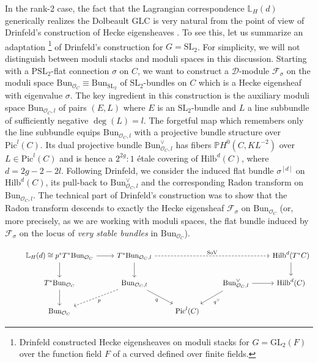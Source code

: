 \documentclass[twoside, 11pt]{article}
\numberwithin{equation}{section}
\theoremstyle{theorem}
\numberwithin{theorem}{section}
\theoremstyle{definition}
\begin{document}
In the rank-2 case, the fact that the Lagrangian correspondence $\mathbb{L}_H(d)$ generically realizes the Dolbeault GLC is very natural from the point of view of Drinfeld's construction of Hecke eigensheaves \cite{Drinfeld}.
To see this, let us summarize an adaptation 
\footnote{Drinfeld constructed Hecke eigensheaves on moduli stacks for $G = \mathrm{GL}_2(F)$ over the function field $F$ of a curved defined over finite fields.}
of Drinfeld's construction for $G = \mathrm{SL}_2$.
For simplicity, we will not distinguish between moduli stacks and moduli spaces in this discussion.
Starting with a $\mathrm{PSL}_2$-flat connection $\sigma$ on $C$, we want to construct a $\mathcal{D}$-module $\mathcal{F}_\sigma$ on the moduli space $\mathrm{Bun}_{\mathcal{O}_C} \equiv \mathrm{Bun}_{\mathrm{SL}_2}$ of $\mathrm{SL}_2$-bundles on $C$ which is a Hecke eigensheaf with eigenvalue $\sigma$.
The key ingredient in this construction is the auxiliary moduli space $\mathrm{Bun}_{\mathcal{O}_C, l}$ of pairs $(E, L)$ where $E$ is an $\mathrm{SL}_2$-bundle and $L$ a line subbundle of sufficiently negative  $\deg(L) = l$.
The forgetful map which remembers only the line subbundle equips $\mathrm{Bun}_{\mathcal{O}_C, l}$ with a projective bundle structure over $\mathrm{Pic}^l(C)$. 
Its dual projective bundle $\mathrm{Bun}^\vee_{\mathcal{O}_C, l}$ has fibers $\mathbb{P}H^0(C, KL^{-2})$ over $L \in \mathrm{Pic}^l(C)$ and is hence a $2^{2g}:1$ étale covering of $\mathrm{Hilb}^d(C)$, where $d = 2g - 2 - 2l$.
Following Drinfeld, we consider the induced flat bundle $\sigma^{[d]}$ on $\mathrm{Hilb}^d(C)$, its pull-back to $\mathrm{Bun}^\vee_{\mathcal{O}_C, l}$ and the corresponding Radon transform on $\mathrm{Bun}_{\mathcal{O}_C, l}$. 
The technical part of Drinfeld's construction was to show that the Radon transform descends to exactly the Hecke eigensheaf $\mathcal{F}_\sigma$ on $\mathrm{Bun}_{\mathcal{O}_C}$ 
(or, more precisely, as we are working with moduli spaces, the flat bundle induced by $\mathcal{F}_\sigma$ on the locus of \textit{very stable bundles} in $\mathrm{Bun}_{\mathcal{O}_C}$).

\begin{equation}\label{diagram-Drinfeld}
\begin{tikzcd}
&\mathbb{L}_H(d) \cong p^\ast T^\ast \mathrm{Bun}_{\mathcal{O}_C} \arrow{d} \arrow{r} 
&T^\ast \mathrm{Bun}_{\mathcal{O}_C, l} \arrow[dashed]{rrr}{\mathrm{SoV}} \arrow{d} 
& & &\mathrm{Hilb}^{d}(T^\ast C) \arrow{d} \\
&T^\ast \mathrm{Bun}_{\mathcal{O}_C} \arrow{d}
&\mathrm{Bun}_{\mathcal{O}_C, l} \arrow[dashed]{dl}{p} \arrow{dr}[swap]{q}
& &\mathrm{Bun}^\vee_{\mathcal{O}_C, l} \arrow{r} \arrow{dl}{q^\vee} &\mathrm{Hilb}^{d}(C)\\
& \mathrm{Bun}_{\mathcal{O}_C} & &\mathrm{Pic}^{l}(C)
\end{tikzcd}
\end{equation}
\end{document}
